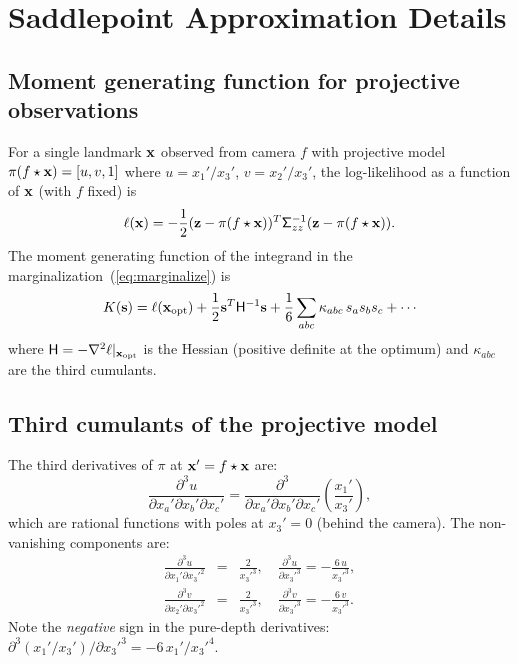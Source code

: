 \documentclass[journal]{IEEEtran}
\newcommand{\sfSigma}[1]{\mathsf{\Sigma}_\mathnormal{#1}}
\newcommand{\beq}{\begin{equation}}
\newcommand{\eeq}{\end{equation}}
\newcommand{\beqar}{\begin{eqnarray}}
\newcommand{\eeqar}{\end{eqnarray}}
\begin{document}
\section{Saddlepoint Approximation Details}
\label{app:saddlepoint}

\subsection{Moment generating function for projective observations}

For a single landmark ${\bf x}$ observed from camera $f$ with projective 
model $\pi(f\star{\bf x}) = [u, v, 1]$ where $u = x_1'/x_3'$, $v = x_2'/x_3'$, 
the log-likelihood as a function of ${\bf x}$ (with $f$ fixed) is
\beq
    \ell({\bf x}) = -\frac{1}{2}({\bf z} - \pi(f\star{\bf x}))^T \sfSigma{zz}^{-1} 
    ({\bf z} - \pi(f\star{\bf x})).
\eeq
The moment generating function of the integrand in the marginalization~(\ref{eq:marginalize}) is
\beq
    K({\bf s}) = \ell({\bf x}_{\rm opt}) + \frac{1}{2}{\bf s}^T \mathsf{H}^{-1} {\bf s}
    + \frac{1}{6}\sum_{abc} \kappa_{abc}\, s_a s_b s_c + \cdots
    \label{eq:cumulantexpansion}
\eeq
where $\mathsf{H} = -\nabla^2 \ell |_{{\bf x}_{\rm opt}}$ is the Hessian 
(positive definite at the optimum) and $\kappa_{abc}$ are the third cumulants.

\subsection{Third cumulants of the projective model}

The third derivatives of $\pi$ at ${\bf x}' = f\star{\bf x}$ are:
\beq
    \frac{\partial^3 u}{\partial x_a' \partial x_b' \partial x_c'} = 
    \frac{\partial^3}{\partial x_a' \partial x_b' \partial x_c'}\left(\frac{x_1'}{x_3'}\right),
\eeq
which are rational functions with poles at $x_3' = 0$ (behind the camera).
The non-vanishing components are:
\beqar
    \frac{\partial^3 u}{\partial x_1' \partial x_3'^2} &=& \frac{2}{x_3'^3}, \quad
    \frac{\partial^3 u}{\partial x_3'^3} = -\frac{6\, u}{x_3'^3}, \nonumber \\
    \frac{\partial^3 v}{\partial x_2' \partial x_3'^2} &=& \frac{2}{x_3'^3}, \quad
    \frac{\partial^3 v}{\partial x_3'^3} = -\frac{6\, v}{x_3'^3}.
    \label{eq:thirdderivs}
\eeqar
Note the \emph{negative} sign in the pure-depth derivatives:
$\partial^3(x_1'/x_3')/\partial x_3'^3 = -6\,x_1'/x_3'^4$.
\end{document}
